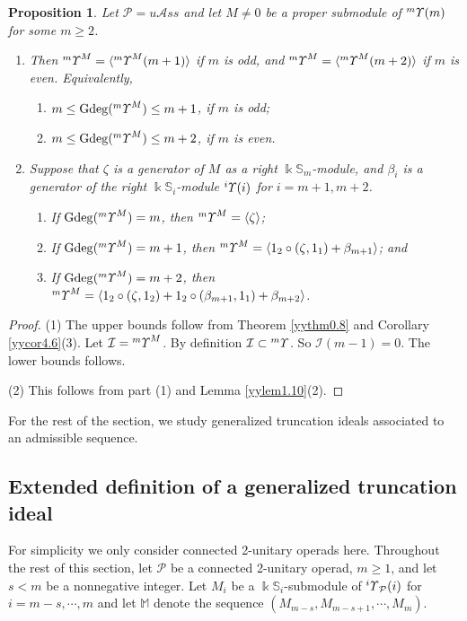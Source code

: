\documentclass{amsart}
\newtheorem{prop}[thm]{Proposition}
\theoremstyle{definition}
\theoremstyle{remark}
\numberwithin{equation}{section}
\def\S{\mathbb{S}}
\def\gd{\operatorname{Gdeg}}
\newcommand{\lr}[1]{\langle #1 \rangle}
\newcommand{\up}[1]{{^{#1}{\it \!\Upsilon}}}
\def \uas{u\mathcal{A}ss}
\def \I{\mathcal{I}}
\def \ip{{\mathcal{P}}}
\def \S{\mathbb{S}}
\begin{document}
\begin{prop}
\label{yypro4.9}
Let $\ip=\uas$ and let $M\neq 0$ be a proper submodule of 
$\up{m}(m)$ for some $m\ge 2$. 
\begin{enumerate}
\item[(1)]
Then $\up{m}^M=\langle \up{m}^M(m+1)\rangle$ if 
$m$ is odd, and $\up{m}^M=\langle \up{m}^M(m+2)\rangle$ if 
$m$ is even. Equivalently,
\begin{enumerate}
\item[(1a)] $m\le \gd(\up{m}^M)\le m+1$, if $m$ is odd;
\item[(1b)] $m\le \gd(\up{m}^M)\le m+2$, if $m$ is even.
\end{enumerate}
\item[(2)]
Suppose that $\zeta$ is a 
generator of $M$ as a right $\Bbbk\S_m$-module, and $\beta_{i}$ 
is a generator of the right $\Bbbk\S_{i}$-module $\up{i}(i)$ for 
$i=m+1, m+2$.
\begin{enumerate}
\item[(2a)] 
If $\gd(\up{m}^M)=m$, then $\up{m}^M=\lr{\zeta}$;
\item[(2b)] 
If $\gd(\up{m}^M)=m+1$, then $\up{m}^M=\lr{1_2\circ 
(\zeta, 1_1)+\beta_{m+1}}$; and 
\item[(2c)] 
If $\gd(\up{m}^M)=m+2$, then $\up{m}^M=\lr{1_2\circ 
(\zeta, 1_2)+1_2\circ (\beta_{m+1}, 1_1)+\beta_{m+2}}$. 
\end{enumerate}
\end{enumerate}
\end{prop}


\begin{proof} 
(1) The upper bounds follow from Theorem \ref{yythm0.8}
and Corollary \ref{yycor4.6}(3). 
Let $\I= \up{m}^M$. By definition $\I\subset \up{m}$. So 
$\I(m-1)=0$. The lower bounds follows.

(2) This follows from part (1) and Lemma \ref{yylem1.10}(2).
\end{proof}

For the rest of the section, we study generalized truncation
ideals associated to an admissible sequence.

\subsection{Extended definition of a generalized truncation 
ideal}
\label{yysec4.4}
For simplicity we only consider connected 2-unitary operads 
here. Throughout the rest of this section, let $\ip$ be a 
connected 2-unitary operad, $m\geq 1$, and let $s<m$ be a nonnegative 
integer. Let $M_i$ be a $\Bbbk \S_i$-submodule of $\up{i}_\ip(i)$ 
for $i=m-s,\cdots,m$ and let ${\mathbb M}$ denote the sequence
$(M_{m-s},M_{m-s+1}, \cdots, M_{m})$.
\end{document}
